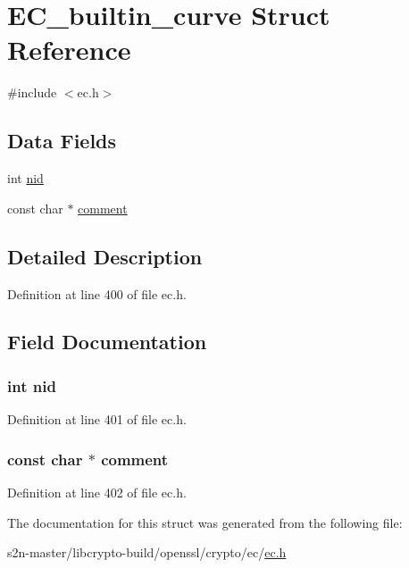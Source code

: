 \hypertarget{struct_e_c__builtin__curve}{}\section{E\+C\+\_\+builtin\+\_\+curve Struct Reference}
\label{struct_e_c__builtin__curve}


{\ttfamily \#include $<$ec.\+h$>$}

\subsection*{Data Fields}
\begin{DoxyCompactItemize}
\item 
int \hyperlink{struct_e_c__builtin__curve_a7235ef62e89328f5155846dc59c6fc37}{nid}
\item 
const char $\ast$ \hyperlink{struct_e_c__builtin__curve_a8e37a600627696f44de893a8f9152478}{comment}
\end{DoxyCompactItemize}


\subsection{Detailed Description}


Definition at line 400 of file ec.\+h.



\subsection{Field Documentation}
\subsubsection[{\texorpdfstring{nid}{nid}}]{\setlength{\rightskip}{0pt plus 5cm}int nid}\hypertarget{struct_e_c__builtin__curve_a7235ef62e89328f5155846dc59c6fc37}{}\label{struct_e_c__builtin__curve_a7235ef62e89328f5155846dc59c6fc37}


Definition at line 401 of file ec.\+h.

\subsubsection[{\texorpdfstring{comment}{comment}}]{\setlength{\rightskip}{0pt plus 5cm}const char $\ast$ comment}\hypertarget{struct_e_c__builtin__curve_a8e37a600627696f44de893a8f9152478}{}\label{struct_e_c__builtin__curve_a8e37a600627696f44de893a8f9152478}


Definition at line 402 of file ec.\+h.



The documentation for this struct was generated from the following file\+:\begin{DoxyCompactItemize}
\item 
s2n-\/master/libcrypto-\/build/openssl/crypto/ec/\hyperlink{crypto_2ec_2ec_8h}{ec.\+h}\end{DoxyCompactItemize}
